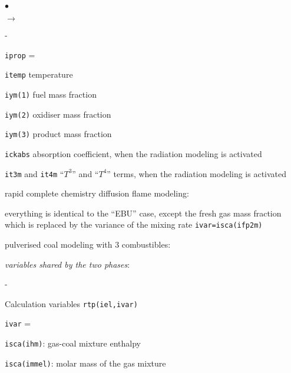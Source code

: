 {{{\begin{list}{$\bullet$}{}
\begin{list}{$\rightarrow$}{}
\begin{list}{-}{}
              \begin{list}{\texttt{iprop} = }{}
               \item \texttt{itemp} temperature
               \item \texttt{iym(1)} fuel mass fraction
               \item \texttt{iym(2)} oxidiser mass fraction
               \item \texttt{iym(3)} product mass fraction
               \item \texttt{ickabs} absorption
                     coefficient, when the radiation modeling is
                     activated
               \item \texttt{it3m} and \texttt{it4m}
                     ``$T^3$'' and ``$T^4$'' terms, when the radiation
                     modeling is activated
              \end{list}
       \end{list}
       \item rapid complete chemistry diffusion flame modeling:
             \begin{list}{}{}
              \item  everything is identical to the ``EBU'' case, except
                     the fresh gas mass fraction which is replaced by the
                     variance of the mixing rate \texttt{ivar=isca(ifp2m)}
             \end{list}
       \item pulverised coal modeling with 3 combustibles:
             \begin{list}{}{}
              \item {\em variables shared by the two phases}:
                    \begin{list}{-}{}
                     \item Calculation variables \texttt{rtp(iel,ivar)}
                           \begin{list}{\texttt{ivar} = }{}
                            \item \texttt{isca(ihm)}: gas-coal mixture enthalpy
                            \item \texttt{isca(immel)}: molar mass of the
                                  gas mixture
                           \end{list}
                    \end{list}

\end{list}
\end{list}
\end{list}}}}
